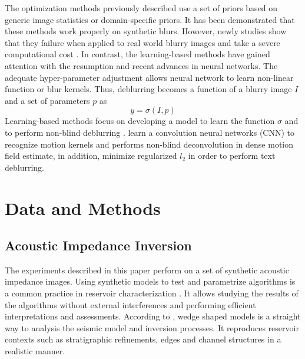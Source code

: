 \documentclass[conference,compsoc]{IEEEtran}
\begin{document}
The optimization methods previously described use a set of priors based on
generic image statistics or domain-specific priors. It has been demonstrated
that these methods work properly on synthetic blurs. However, newly studies show that they failure
when applied to real world blurry images \cite{Lai2016} and take a severe computational cost \cite{Chakrabarti2016}.
In contrast, the learning-based methods have gained attention with the resumption and recent advances in neural
networks. The adequate hyper-parameter adjustment allows neural network to learn
non-linear function or blur kernels. Thus, deblurring becomes a function of a blurry image $I$
and a set of parameters $p$ as
\begin{equation}
 y = \sigma(I,p)
 \label{eq:deblur}
\end{equation}
Learning-based methods focus on developing a model to learn the function $\sigma$ \cite{Hradis2015}
and to perform non-blind deblurring \cite{Chakrabarti2016}. \cite{Sun2015} learn a convolution neural networks (CNN) to
recognize motion kernels and performs non-blind deconvolution in
dense motion field estimate, in addition, \cite{Hradis2015} minimize regularized $l_2$ 
in order to perform text deblurring.

\section{Data and Methods} \label{DMsection}
\subsection{Acoustic Impedance Inversion}
The experiments described in this paper perform
on a set of synthetic acoustic impedance images. Using synthetic models
to test and parametrize algorithms is a common practice in reservoir characterization \cite{sergio}. It allows studying the
results of the algorithms without external interferences and performing efficient interpretations and assessments. 
According to \cite{Harvey}, wedge shaped models is a straight way to analysis the
seismic model and inversion processes. It reproduces
reservoir contexts such as stratigraphic refinements, edges and channel structures in a realistic manner.
\end{document}
